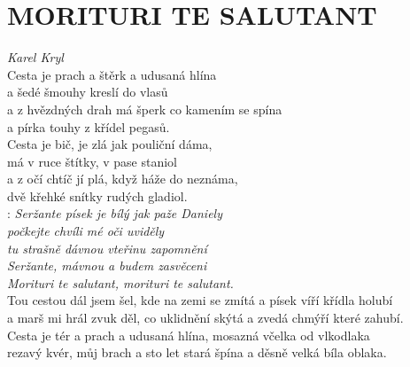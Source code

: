 \section*{\Huge MORITURI TE SALUTANT}
\emph{Karel Kryl}\\

Cesta je prach a štěrk a udusaná hlína\\
a šedé šmouhy kreslí do vlasů\\
a z hvězdných drah má šperk co kamením se spína\\
a pírka touhy z křídel pegasů.\\

Cesta je bič, je zlá jak pouliční dáma,\\
má v ruce štítky, v pase staniol\\
a z očí chtíč jí plá, když háže do neznáma,\\
dvě křehké snítky rudých gladiol.\\

\textregistered: \emph{Seržante písek je bílý jak paže Daniely\\
počkejte chvíli mé oči uviděly\\
tu strašně dávnou vteřinu zapomnění\\
Seržante, mávnou a budem zasvěceni\\
Morituri te salutant, morituri te salutant.}\\

Tou cestou dál jsem šel, kde na zemi se zmítá a písek víří křídla holubí\\
a marš mi hrál zvuk děl, co uklidnění skýtá a zvedá chmýří které zahubí.\\

Cesta je tér a prach a udusaná hlína, mosazná včelka od vlkodlaka\\
rezavý kvér, můj brach a sto let stará špína a děsně velká bíla oblaka. \textregistered

\newpage
